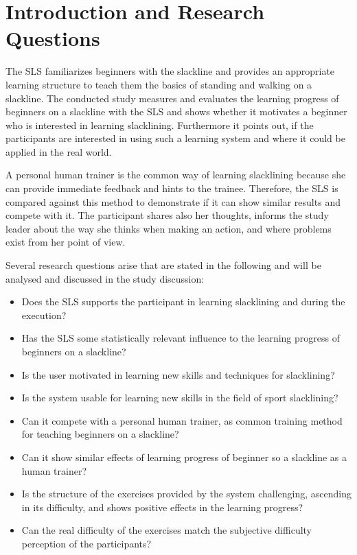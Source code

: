 \section{Introduction and Research Questions}\label{6_introduction}
The SLS familiarizes beginners with the slackline and provides an appropriate learning structure to teach them the basics of standing and walking on a slackline.
The conducted study measures and evaluates the learning progress of beginners on a slackline with the SLS and shows whether it motivates a beginner who is interested in learning slacklining.
Furthermore it points out, if the participants are interested in using such a learning system and where it could be applied in the real world.

A personal human trainer is the common way of learning slacklining because she can provide immediate feedback and hints to the trainee.
Therefore, the SLS is compared against this method to demonstrate if it can show similar results and compete with it.
The participant shares also her thoughts, informs the study leader about the way she thinks when making an action, and where problems exist from her point of view.

Several research questions arise that are stated in the following and will be analysed and discussed in the study discussion:

\begin{itemize}
\item Does the SLS supports the participant in learning slacklining and during the execution?
\item Has the SLS some statistically relevant influence to the learning progress of beginners on a slackline?
\item Is the user motivated in learning new skills and techniques for slacklining?
\item Is the system usable for learning new skills in the field of sport slacklining?
\item Can it compete with a personal human trainer, as common training method for teaching beginners on a slackline?
\item Can it show similar effects of learning progress of beginner so a slackline as a human trainer?
\item Is the structure of the exercises provided by the system challenging, ascending in its difficulty, and shows positive effects in the learning progress?
\item Can the real difficulty of the exercises match the subjective difficulty perception of the participants?
\end{itemize}
